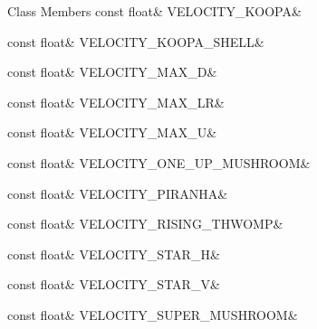 \begin{DoxyFields}{Class Members}
\mbox{\label{namespaceMelloMario_1_1Theming_a8975d815db0ae89d4ffe5bc3e41c4632}} 
const float&
VELOCITY\_KOOPA&
\\
\hline

\mbox{\label{namespaceMelloMario_1_1Theming_a52e4cfb9dc37f2115d5b265c6cb59477}} 
const float&
VELOCITY\_KOOPA\_SHELL&
\\
\hline

\mbox{\label{namespaceMelloMario_1_1Theming_ad047c3372c46b8f4c062cd06f2c95361}} 
const float&
VELOCITY\_MAX\_D&
\\
\hline

\mbox{\label{namespaceMelloMario_1_1Theming_aea28ab53e013d28ca9dc22cd14c9c014}} 
const float&
VELOCITY\_MAX\_LR&
\\
\hline

\mbox{\label{namespaceMelloMario_1_1Theming_a1f5d1dd124bf1aa6265d2739e43c6d61}} 
const float&
VELOCITY\_MAX\_U&
\\
\hline

\mbox{\label{namespaceMelloMario_1_1Theming_a19ebf4385574fbaf7d6a906073e688f8}} 
const float&
VELOCITY\_ONE\_UP\_MUSHROOM&
\\
\hline

\mbox{\label{namespaceMelloMario_1_1Theming_a4868a3221dfc46fb5969537808351059}} 
const float&
VELOCITY\_PIRANHA&
\\
\hline

\mbox{\label{namespaceMelloMario_1_1Theming_a07242ee7309a6dcf4928525021c5d901}} 
const float&
VELOCITY\_RISING\_THWOMP&
\\
\hline

\mbox{\label{namespaceMelloMario_1_1Theming_a981850760f2c7467fd31ac767f8dbc25}} 
const float&
VELOCITY\_STAR\_H&
\\
\hline

\mbox{\label{namespaceMelloMario_1_1Theming_ad146b51826e9e7f6c6d17c4948a14ced}} 
const float&
VELOCITY\_STAR\_V&
\\
\hline

\mbox{\label{namespaceMelloMario_1_1Theming_a3053893d4b522adf72ea2ac9d71b53fd}} 
const float&
VELOCITY\_SUPER\_MUSHROOM&
\\
\hline

\end{DoxyFields}
